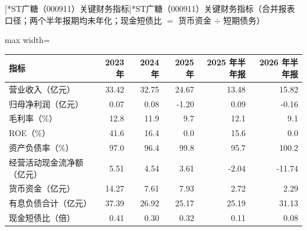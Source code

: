 \begin{center}\small\setlength{\tabcolsep}{3.4pt}
[*ST广糖（000911）关键财务指标]{*ST广糖（000911）关键财务指标（合并报表口径；两个半年报期均未年化；现金短债比 $=$ 货币资金 $\div$ 短期债务）}
\begin{adjustbox}{max width=\textwidth}
\begin{tabular}{@{}lrrrrr@{}}
\toprule
指标 & 2023 年 & 2024 年 & 2025 年 & 2025 年半年报 & 2026 年半年报 \\
\midrule
营业收入（亿元） & 33.42 & 32.75 & 24.67 & 13.48 & 15.82 \\
归母净利润（亿元） & 0.07 & 0.08 & -1.20 & 0.09 & -0.16 \\
毛利率（\%） & 12.8 & 11.9 & 9.7 & 12.1 & 9.1 \\
ROE（\%） & 41.6 & 16.4 & 0.0 & 15.6 & 0.0 \\
资产负债率（\%） & 97.0 & 96.4 & 99.8 & 95.7 & 100.2 \\
经营活动现金流净额（亿元） & 5.51 & 4.54 & 3.61 & -2.04 & -11.74 \\
货币资金（亿元） & 14.27 & 7.61 & 7.93 & 2.72 & 2.29 \\
有息负债合计（亿元） & 37.39 & 26.92 & 25.17 & 25.19 & 31.13 \\
现金短债比（倍） & 0.41 & 0.30 & 0.32 & 0.11 & 0.08 \\
\bottomrule
\end{tabular}
\end{adjustbox}
\end{center}

